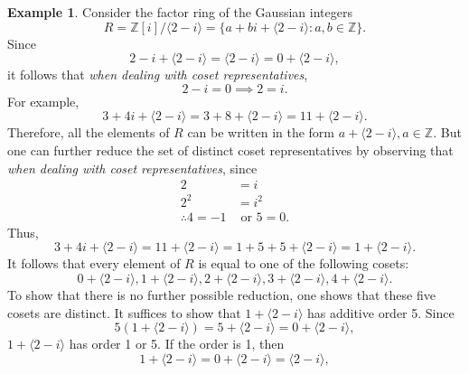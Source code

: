\documentclass{article}
\theoremstyle{definition}
\newtheorem{example}{Example}[section]
\begin{document}
\begin{example}
    Consider the factor ring of the Gaussian integers
    \begin{equation*}
        R=\mathbb{Z}[i]/\langle 2-i \rangle=\{a+bi+\langle 2-i \rangle: a,b\in\mathbb{Z}\}.
    \end{equation*}
    Since
    \begin{equation*}
        2-i+\langle 2-i \rangle=\langle 2-i \rangle=0+\langle 2-i \rangle,
    \end{equation*}
    it follows that \textit{when dealing with coset representatives}, 
    \begin{equation*}
        2-i=0 \implies 2=i.
    \end{equation*}
    For example,
    \begin{equation*}
        3+4i+\langle 2-i \rangle = 3+8+\langle 2-i \rangle=11+\langle 2-i \rangle.
    \end{equation*}
    Therefore, all the elements of $R$ can be written in the form $a+\langle 2-i \rangle, a\in\mathbb{Z}$. But one can further reduce the set of distinct coset representatives by observing that \textit{when dealing with coset representatives}, since
    \begin{align*}
        2&=i \\
        2^2&=i^2 \\
        \therefore 4=-1 & \text{ or } 5=0.
    \end{align*}
    Thus,
    \begin{equation*}
        3+4i+\langle 2-i \rangle = 11+\langle 2-i \rangle = 1+5+5+\langle 2-i \rangle=1+\langle 2-i \rangle.
    \end{equation*}
    It follows that every element of $R$ is equal to one of the following cosets:
    \begin{equation*}
        0+\langle 2-i \rangle, 1+\langle 2-i \rangle, 2+\langle 2-i \rangle, 3+\langle 2-i \rangle, 4+\langle 2-i \rangle.
    \end{equation*}
    To show that there is no further possible reduction, one shows that these five cosets are distinct. It suffices to show that $1+\langle 2-i \rangle$ has additive order 5. Since 
    \begin{equation*}
        5(1+\langle 2-i \rangle)=5+\langle 2-i \rangle=0+\langle 2-i \rangle,
    \end{equation*}
    $1+\langle 2-i \rangle$ has order 1 or 5. If the order is 1, then 
    \begin{equation*}
        1+\langle 2-i \rangle=0+\langle 2-i \rangle=\langle 2-i \rangle,

\end{equation*}
\end{example}
\end{document}
